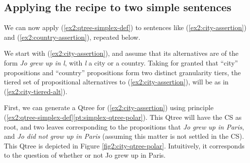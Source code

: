 \subsection{Applying the recipe to two simple sentences}

We can now apply (\ref{ex2:qtree-simplex-def}) to sentences like (\ref{ex2:city-assertion}) and (\ref{ex2:country-assertion}), repeated below.

\begin{exe}
	\begin{xlist}
	\end{xlist}
\end{exe}

We start with (\ref{ex2:city-assertion}), and assume that its alternatives are of the form \textit{Jo grew up in l}, with \textit{l} a city or a country. Taking for granted that ``city'' propositions and ``country'' propositions form two distinct granularity tiers, the tiered set of propositional alternatives to (\ref{ex2:city-assertion}), will be as in (\ref{ex2:city-tiered-alt}).

\begin{exe}
	\label{ex2:city-tiered-alt}
\end{exe} 



First, we can generate a Qtree for (\ref{ex2:city-assertion})  using principle (\ref{ex2:qtree-simplex-def}\ref{pt:simplex-qtree-polar}). This Qtree will have the CS as root, and two leaves corresponding to the propositions that \textit{Jo grew up in Paris}, and \textit{Jo did not grow up in Paris} (assuming this matter is not settled in the CS). This Qtree is depicted in Figure \ref{fig2:city-qtree-polar}. Intuitively, it corresponds to the question of whether or not Jo grew up in Paris.

